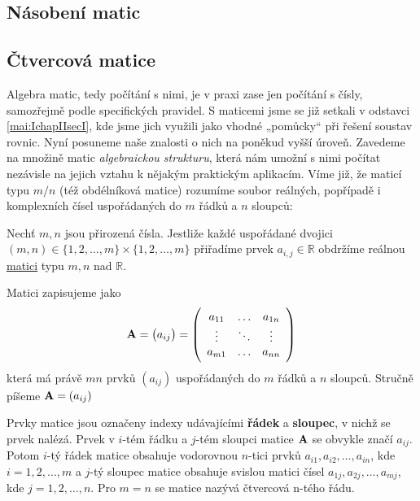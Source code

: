    \subsection{Násobení  matic}\label{mai:IchapIIsecIIIsubIII}
    \subsection{Čtvercová matice}\label{mai:IchapIIsecIIIsubIV}
    Algebra matic, tedy počítání s nimi, je v praxi zase jen počítání s čísly, samozřejmě podle
    specifických pravidel. S maticemi jsme se již setkali v odstavci \ref{mai:IchapIIsecI}, kde 
    jsme jich využili jako vhodné „pomůcky“ při řešení soustav rovnic. Nyní posuneme naše 
    znalosti o nich na poněkud vyšší úroveň. Zavedeme na množině matic \emph{algebraickou 
    strukturu}, která nám umožní s nimi počítat nezávisle na jejich vztahu k nějakým praktickým 
    aplikacím. Víme již, že maticí typu \(m/n\) (též obdélníková matice) rozumíme soubor reálných, 
    popřípadě i komplexních čísel uspořádaných do \(m\) řádků a \(n\) sloupců:
    
    \begin{definition}\label{def_matice}
      Nechť \(m, n\) jsou přirozená čísla. Jestliže každé uspořádané dvojici \((m,n)\in 
      \{1,2,\ldots,m\}\times \{1,2,\ldots,m\}\) přiřadíme prvek \(a_{i,j}\in\mathbb{R}\) obdržíme 
      reálnou \href{http://cs.wikipedia.org/wiki/Matice}{matici} typu \(m,n\) nad \(\mathbb{R}\). 
      
      Matici zapisujeme jako
      \begin{equation}\label{matice_zapis}
        \mathbf{A} = \left(a_{ij}\right) =\left(
                                      \begin{array}{ccc}
                                        a_{11} & \ldots & a_{1n} \\
                                        \vdots & \ddots & \vdots \\
                                        a_{m1} & \ldots & a_{nn}
                                      \end{array}
                                 \right)
      \end{equation}
      která má právě \(mn\) prvků \((a_{ij})\) uspořádaných do \(m\) řádků a \(n\) sloupců. Stručně 
      píšeme \(\mathbf{A} = (a_{ij})\)
    \end{definition}

    Prvky matice jsou označeny indexy udávajícími \textbf{řádek} a \textbf{sloupec}, v nichž se 
    prvek nalézá. Prvek v \(i\)-tém řádku a \(j\)-tém sloupci matice \(\mathbf{A}\) se obvykle značí 
    \(a_{ij}\). Potom \(i\)-tý řádek matice  obsahuje vodorovnou \(n\)-tici prvků \(a_{i1}, 
    a_{i2}, \ldots,a_{in} \), kde \(i=  1,2,\ldots,m\) a \(j\)-tý sloupec matice obsahuje svislou 
    matici čísel \(a_{1j},a_{2j},\ldots,a_{mj}\), kde \(j = 1,2,\ldots,n\). Pro \(m = n\) se matice 
    nazývá čtvercová n-tého řádu. 
      
